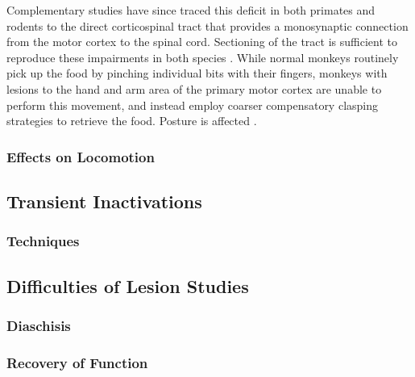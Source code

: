 Complementary studies have since traced this deficit in both primates and rodents to the direct corticospinal tract that provides a monosynaptic connection from the motor cortex to the spinal cord. Sectioning of the tract is sufficient to reproduce these impairments in both species \cite{Lawrence1968}. While normal monkeys routinely pick up the food by pinching individual bits with their fingers, monkeys with lesions to the hand and arm area of the primary motor cortex are unable to perform this movement, and instead employ coarser compensatory clasping strategies to retrieve the food. Posture is affected \cite{Lashley1924}.

\subsubsection{Effects on Locomotion}

\subsection{Transient Inactivations}

\subsubsection{Techniques}

\subsection{Difficulties of Lesion Studies}

\subsubsection{Diaschisis}

\subsubsection{Recovery of Function}
